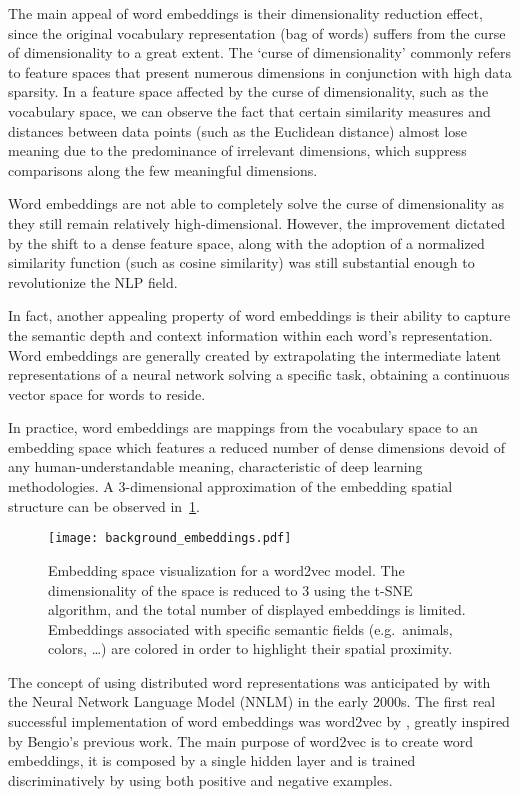 The main appeal of word embeddings is their dimensionality reduction effect, since the original vocabulary representation (bag of words) suffers from the curse of dimensionality to a great extent.
The `curse of dimensionality' commonly refers to feature spaces that present numerous dimensions in conjunction with high data sparsity.
In a feature space affected by the curse of dimensionality, such as the vocabulary space, we can observe the fact that certain similarity measures and distances between data points (such as the Euclidean distance) almost lose meaning due to the predominance of irrelevant dimensions, which suppress comparisons along the few meaningful dimensions.

Word embeddings are not able to completely solve the curse of dimensionality as they still remain relatively high-dimensional.
However, the improvement dictated by the shift to a dense feature space, along with the adoption of a normalized similarity function (such as cosine similarity) was still substantial enough to revolutionize the NLP field.

In fact, another appealing property of word embeddings is their ability to capture the semantic depth and context information within each word's representation.
Word embeddings are generally created by extrapolating the intermediate latent representations of a neural network solving a specific task, obtaining a continuous vector space for words to reside.

In practice, word embeddings are mappings from the vocabulary space to an embedding space which features a reduced number of dense dimensions devoid of any human-understandable meaning, characteristic of deep learning methodologies.
A $3$-dimensional approximation of the embedding spatial structure can be observed in~\cref{fig:background_embeddings}.

\begin{figure}[t!]
    \centering
    \texttt{[image: background\_embeddings.pdf]}
    \caption[Embedding space visualization for a word2vec model.]{Embedding space visualization for a word2vec model. The dimensionality of the space is reduced to $3$ using the t-SNE algorithm, and the total number of displayed embeddings is limited. Embeddings associated with specific semantic fields (e.g.\ animals, colors, \dots) are colored in order to highlight their spatial proximity.}
    \label{fig:background_embeddings}
\end{figure}

The concept of using distributed word representations was anticipated by \citet{bengio2000} with the Neural Network Language Model (NNLM) in the early 2000s.
The first real successful implementation of word embeddings was word2vec by \citet{mikolov2013}, greatly inspired by Bengio's previous work.
The main purpose of word2vec is to create word embeddings, it is composed by a single hidden layer and is trained discriminatively by using both positive and negative examples.

